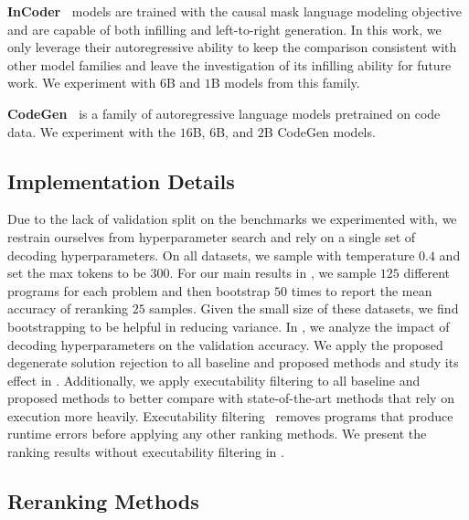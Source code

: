 \documentclass[nohyperref]{article}
\theoremstyle{plain}
\theoremstyle{definition}
\theoremstyle{remark}
\renewcommand{\paragraph}[1]{
     \textbf{#1} 
 }
\begin{document}
\paragraph{InCoder~\citep{incoder}} models are trained with the causal mask language modeling objective and are capable of both infilling and left-to-right generation.
In this work, we only leverage their autoregressive ability to keep the comparison consistent with other model families and leave the investigation of its infilling ability for future work.
We experiment with $6$B and $1$B models from this family.

\paragraph{CodeGen~\citep{codegen}} is a family of autoregressive language models pretrained on code data. We experiment with the $16$B, $6$B, and $2$B CodeGen models.

\subsection{Implementation Details}
Due to the lack of validation split on the benchmarks we experimented with, we restrain ourselves from hyperparameter search and rely on a single set of decoding hyperparameters.
On all datasets, we sample with temperature $0.4$ and set the max tokens to be $300$.
For our main results in , we sample $125$ different programs for each problem and then bootstrap $50$ times to report the mean accuracy of reranking $25$ samples.
Given the small size of these datasets, we find bootstrapping to be helpful in reducing variance.
In , we analyze the impact of decoding hyperparameters on the validation accuracy.
We apply the proposed degenerate solution rejection to all baseline and proposed methods and study its effect in .
Additionally, we apply executability filtering to all baseline and proposed methods to better compare with state-of-the-art methods that rely on execution more heavily.
Executability filtering~\citep{mbr} removes programs that produce runtime errors before applying any other ranking methods.
We present the ranking results without executability filtering in .

\subsection{Reranking Methods}
\end{document}
